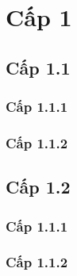 \newpage

\section{Cấp 1}

\lipsum[1]

\subsection{Cấp 1.1}

\lipsum[1]

\subsubsection{Cấp 1.1.1}

\lipsum[1]

\subsubsection{Cấp 1.1.2}

\lipsum[1]

\subsection{Cấp 1.2}

\lipsum[1]

\subsubsection{Cấp 1.1.1}

\lipsum[1]

\subsubsection{Cấp 1.1.2}

\lipsum[1]
